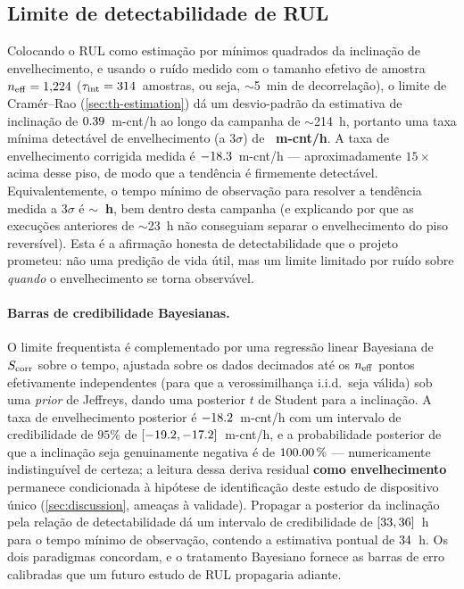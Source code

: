 \subsection{Limite de detectabilidade de RUL}
\label{sec:res-rul}
Colocando o RUL como estimação por mínimos quadrados da inclinação de
envelhecimento, e usando o ruído medido com o tamanho efetivo de amostra
$n_{\mathrm{eff}}=1{,}224$ ($\tau_{\mathrm{int}}=314$~amostras, ou seja,
$\sim$5~min de decorrelação), o limite de Cram\'er--Rao
(\cref{sec:th-estimation}) dá um desvio-padrão da estimativa de inclinação
de $0.39$~m-cnt/h ao longo da campanha de $\sim$214~h, portanto uma
taxa mínima detectável de envelhecimento (a $3\sigma$) de
\textbf{\valMinDetectRate~m-cnt/h}. A taxa de envelhecimento corrigida
medida é $-18.3$~m-cnt/h --- aproximadamente $15\times$ acima desse
piso, de modo que a tendência é firmemente detectável. Equivalentemente, o
tempo mínimo de observação para resolver a tendência medida a $3\sigma$ é
\textbf{$\sim$\valMinObsTime~h}, bem dentro desta campanha (e explicando por
que as execuções anteriores de $\sim$23~h não conseguiam separar o
envelhecimento do piso reversível). Esta é a afirmação honesta de
detectabilidade que o projeto prometeu: não uma predição de vida útil, mas
um limite limitado por ruído sobre \emph{quando} o envelhecimento se torna
observável.

\paragraph{Barras de credibilidade Bayesianas.} O limite frequentista é
complementado por uma regressão linear Bayesiana de $S_{\mathrm{corr}}$ sobre o tempo,
ajustada sobre os dados decimados até os $n_{\mathrm{eff}}$ pontos efetivamente
independentes (para que a verossimilhança i.i.d.\ seja válida) sob uma
\emph{prior} de Jeffreys, dando uma posterior $t$ de Student para a
inclinação. A taxa de envelhecimento posterior é $-18.2$~m-cnt/h
com um intervalo de credibilidade de $95\%$ de
$[-19.2,-17.2]$~m-cnt/h, e a probabilidade posterior de
que a inclinação seja genuinamente negativa é de $100.00\,\%$ ---
numericamente indistinguível de certeza; a leitura dessa deriva residual
\textbf{como envelhecimento} permanece condicionada à hipótese de
identificação deste estudo de dispositivo único (\cref{sec:discussion},
ameaças à validade). Propagar a posterior da inclinação pela relação de detectabilidade
dá um intervalo de credibilidade de $[33,36]$~h para
o tempo mínimo de observação, contendo a estimativa pontual de
$34$~h. Os dois paradigmas concordam, e o tratamento Bayesiano
fornece as barras de erro calibradas que um futuro estudo de RUL propagaria
adiante.


